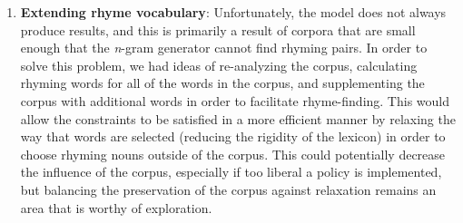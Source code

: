 \documentclass[10pt,twocolumn]{article}
\begin{document}
\begin{enumerate}
\item \textbf{Extending rhyme vocabulary}: Unfortunately, the model does not always produce results, and this is primarily a result of corpora that are small enough that the \emph{n}-gram generator cannot find rhyming pairs. In order to solve this problem, we had ideas of re-analyzing the corpus, calculating rhyming words for all of the words in the corpus, and supplementing the corpus with additional words in order to facilitate rhyme-finding. This would allow the constraints to be satisfied in a more efficient manner by relaxing the way that words are selected (reducing the rigidity of the lexicon) in order to choose rhyming nouns outside of the corpus. This could potentially decrease the influence of the corpus, especially if too liberal a policy is implemented, but balancing the preservation of the corpus against relaxation remains an area that is worthy of exploration.
\end{enumerate}
\end{document}
